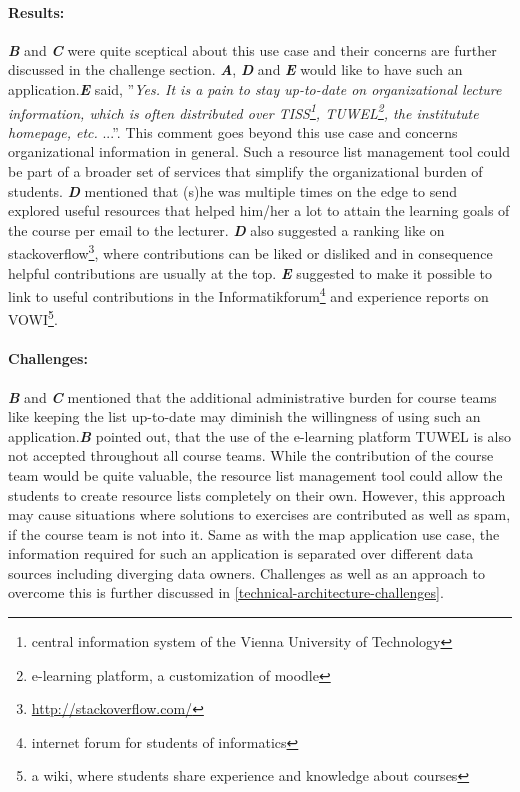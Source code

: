 \documentclass{article}
\begin{document}
\paragraph{Results:}
\textit{\textbf{B}} and \textit{\textbf{C}} were quite sceptical about this use case and their concerns are further discussed in the challenge section. \textit{\textbf{A}}, \textit{\textbf{D}} and \textit{\textbf{E}} would like to have such an application.\textit{\textbf{E}} said, ''\textit{Yes. It is a pain to stay up-to-date on organizational lecture information, which is often distributed over TISS\footnote{central information system of the Vienna University of Technology}, TUWEL\footnote{e-learning platform, a customization of moodle}, the institutute homepage, etc.} ...''. This comment goes beyond this use case and concerns organizational information in general. Such a resource list management tool could be part of a broader set of services that simplify the organizational burden of students. \textit{\textbf{D}} mentioned that (s)he was multiple times on the edge to send explored useful resources that helped him/her a lot to attain the learning goals of the course per email to the lecturer. \textit{\textbf{D}} also suggested a ranking like on stackoverflow\footnote{\url{http://stackoverflow.com/}}, where contributions can be liked or disliked and in consequence helpful contributions are usually at the top. \textit{\textbf{E}} suggested to make it possible to link to useful contributions in the Informatikforum\footnote{internet forum for students of informatics} and experience reports on VOWI\footnote{a wiki, where students share experience and knowledge about courses}.

\paragraph{Challenges:}
\textit{\textbf{B}} and \textit{\textbf{C}} mentioned that the additional administrative burden for course teams like keeping the list up-to-date may diminish the willingness of using such an application.\textit{\textbf{B}} pointed out, that the use of the e-learning platform TUWEL is also not accepted throughout all course teams. While the contribution of the course team would be quite valuable, the resource list management tool could allow the students to create resource lists completely on their own. However, this approach may cause situations where solutions to exercises are contributed as well as spam, if the course team is not into it. Same as with the map application use case, the information required for such an application is separated over different data sources including diverging data owners. Challenges as well as an approach to overcome this is further discussed in \ref{technical-architecture-challenges}.
\end{document}
